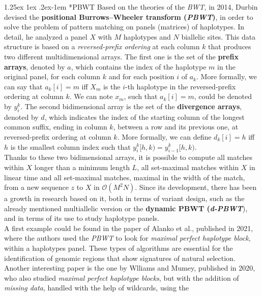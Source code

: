 \documentclass[a4paper,11pt, oneside]{article}
\makeatletter
\renewcommand{\paragraph}{%
  \@startsection{paragraph}{4}%
  {\z@}{1.25ex \@plus 1ex \@minus .2ex}{-1em}%
  {\normalfont\normalsize\bfseries}%
}
\makeatother
\begin{document}
\paragraph*{PBWT}
Based on the theories of the \textit{BWT}, in 2014, Durbin devised the
\textbf{positional Burrows–Wheeler transform (\textit{PBWT})}, in order to
solve the problem of pattern matching on panels (matrices) of haplotypes. In
detail, he analyzed a panel $X$ with $M$ haplotypes and $N$ biallelic
sites. This data structure is based on a \textit{reversed-prefix ordering} at
each column $k$ that produces two different multidimensional arrays. The first
one is the set of the \textbf{prefix arrays}, denoted by $a$, which contains the
index of the haplotype $m$ in the original panel, for each column $k$ and for  
each position $i$ of $a_k$. More formally, we can say that $a_k[i]=m$ iff $X_m$
is the $i$-th haplotype in the reversed-prefix ordering at column $k$. We can
note $x_m$, such that $a_k[i]=m$, could be denoted by $y_i^k$. The second
bidimensional array is the set of the \textbf{divergence arrays}, denoted by
$d$, which indicates the index of the starting column of the longest common
suffix, ending in column $k$, between a row and its previous one, at
reversed-prefix ordering at column $k$. More formally, we can define $d_k[i]=h$
iff $h$ is the smallest column index such that $y_i^k[h,k)=y_{i-1}^k[h,k)$. \\
Thanks to these two bidimensional arrays, it is possible to compute all matches
within $X$ longer than a minimum length $L$, all set-maximal matches within $X$
in linear time and all set-maximal matches, maximal in the width of the match,
from a new sequence $z$ to $X$ in $\mathcal{O}(M^2N)$.
Since its development, there has been a growth in
research based on it, both in terms of variant design, such as the already
mentioned multiallelic version or the \textbf{dynamic PBWT (\textit{d-PBWT}}),
and in terms of its use to study haplotype panels.\\
A first example could be found in the paper of Alanko et al., published in
2021, where the authors used the \textit{PBWT} to look for \textit{maximal
  perfect haplotype block}, within a haplotypes panel. These types of
algorithms are essential for the identification of genomic regions that show
signatures of natural selection.\\
Another interesting paper is the one by Wlliams and Mumey, published in 2020,
who also studied \textit{maximal perfect haplotype blocks}, but with the
addition of \textit{missing data}, handled with the help of wildcards, using the
\end{document}
